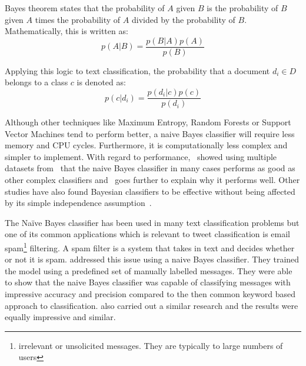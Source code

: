 Bayes theorem states that the probability of $A$ given $B$ is the probability of $B$ given $A$ times
the probability of $A$ divided by the probability of $B$. Mathematically, this is written as:
\begin{equation}
  p(A|B) = \frac{p(B|A)p(A)}{p(B)}
\end{equation}

Applying this logic to text classification, the probability that a document $d_i \in D$ belongs to a
class $c$ is denoted as:
\begin{equation}
  p(c|d_i) = \frac{p(d_i|c)p(c)}{p(d_i)}
\end{equation}

Although other techniques like Maximum Entropy, Random Forests or Support Vector Machines tend to
perform better, a naive Bayes classifier will require less memory and CPU cycles. Furthermore, it is
computationally less complex and simpler to implement. With regard to
performance,~\citet{huangLuLing2003} showed using multiple datasets from~\citet{blakeMerz1998} that
the naive Bayes classifier in many cases performs as good as other complex classifiers
and~\citet{zhang2004} goes further to explain why it performs well. Other studies have also found
Bayesian classifiers to be effective without being affected by its simple independence
assumption~\citep{langley1992analysis,manning2008}.

The Na\"{i}ve Bayes classifier has been used in many text classification problems but one of its
common applications which is relevant to tweet classification is email spam\footnote{irrelevant or
unsolicited messages. They are typically to large numbers of users} filtering. A spam
filter is a system that takes in text and decides whether or not it is
spam. \citet{androutsopoulos2000learning} addressed this issue using a naive Bayes classifier. They
trained the model using a predefined set of manually labelled messages. They were able to show that
the naive Bayes classifier was capable of classifying messages with impressive accuracy and precision
compared to the then common keyword based approach to classification. \citet{deshpande2007evaluation}
also carried out a similar research and the results were equally impressive and similar.

